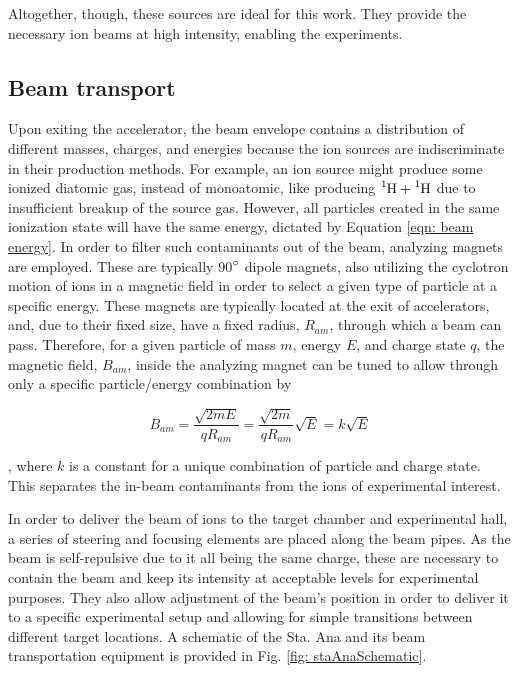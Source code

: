 Altogether, though, these sources are ideal for this work. They provide the necessary ion beams at high intensity, enabling the experiments. 




\subsection{Beam transport}
\label{sec: beamline}


Upon exiting the accelerator, the beam envelope contains a distribution of different masses, charges, and energies because the ion sources are indiscriminate in their production methods. For example, an ion source might produce some ionized diatomic gas, instead of monoatomic, like producing $\ce{^{1}H}+\ce{^{1}H}$ due to insufficient breakup of the source gas. However, all particles created in the same ionization state will have the same energy, dictated by Equation \ref{eqn: beam energy}. In order to filter such contaminants out of the beam, analyzing magnets are employed. These are typically 90$\degree$ dipole magnets, also utilizing the cyclotron motion of ions in a magnetic field in order to select a given type of particle at a specific energy. These magnets are typically located at the exit of accelerators, and, due to their fixed size, have a fixed radius, $R_{am}$, through which a beam can pass. Therefore, for a given particle of mass $m$, energy $E$, and charge state $q$, the magnetic field, $B_{am}$, inside the analyzing magnet can be tuned to allow through only a specific particle/energy combination by

\begin{equation}
B_{am} = \dfrac{\sqrt{2 m E}}{q R_{am}} = \dfrac{\sqrt{2m}}{q R_{am}} \sqrt{E} = k \sqrt{E}
\label{eqn: analyzingMagnet}
\end{equation}

\noindent, where $k$ is a constant for a unique combination of particle and charge state. This separates the in-beam contaminants from the ions of experimental interest.  

In order to deliver the beam of ions to the target chamber and experimental hall, a series of steering and focusing elements are placed along the beam pipes. As the beam is self-repulsive due to it all being the same charge, these are necessary to contain the beam and keep its intensity at acceptable levels for experimental purposes. They also allow adjustment of the beam's position in order to deliver it to a specific experimental setup and allowing for simple transitions between different target locations. A schematic of the Sta. Ana and its beam transportation equipment is provided in Fig. \ref{fig: staAnaSchematic}. 


